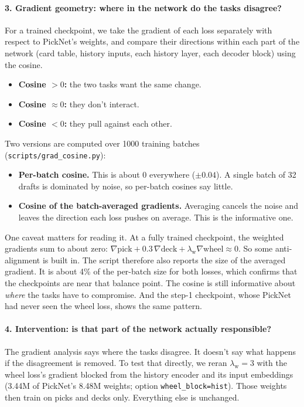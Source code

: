 \documentclass[11pt,letterpaper]{article}
\newcommand{\code}[1]{\texttt{\small #1}}
\newcommand{\lw}{\lambda_{\text{w}}}
\begin{document}
\paragraph{3. Gradient geometry: where in the network do the tasks disagree?} For a trained checkpoint, we take the
gradient of each loss separately with respect to PickNet's weights, and compare their directions within each part
of the network (card table, history inputs, each history layer, each decoder block) using the cosine.
\begin{itemize}
\item \textbf{Cosine $>0$:} the two tasks want the same change.
\item \textbf{Cosine $\approx0$:} they don't interact.
\item \textbf{Cosine $<0$:} they pull against each other.
\end{itemize}
Two versions are computed over 1000 training batches (\code{scripts/grad\_cosine.py}):
\begin{itemize}
\item \textbf{Per-batch cosine.} This is about 0 everywhere ($\pm0.04$). A single batch of 32 drafts is dominated
by noise, so per-batch cosines say little.
\item \textbf{Cosine of the batch-averaged gradients.} Averaging cancels the noise and leaves the direction each
loss pushes on average. This is the informative one.
\end{itemize}
One caveat matters for reading it. At a fully trained checkpoint, the weighted gradients sum to about zero:
$\nabla\text{pick} + 0.3\,\nabla\text{deck} + \lw\nabla\text{wheel} \approx 0$. So some anti-alignment is
built in. The script therefore also reports the size of the averaged gradient. It is about 4\% of the per-batch
size for both losses, which confirms that the checkpoints are near that balance point. The cosine is still
informative about \emph{where} the tasks have to compromise. And the step-1 checkpoint, whose PickNet had never
seen the wheel loss, shows the same pattern.

\paragraph{4. Intervention: is that part of the network actually responsible?} The gradient analysis says where the
tasks disagree. It doesn't say what happens if the disagreement is removed. To test that directly, we reran
$\lw=3$ with the wheel loss's gradient blocked from the history encoder and its input embeddings (3.44M of
PickNet's 8.48M weights; option \code{wheel\_block=hist}). Those weights then train on picks and decks only.
Everything else is unchanged.
\end{document}
